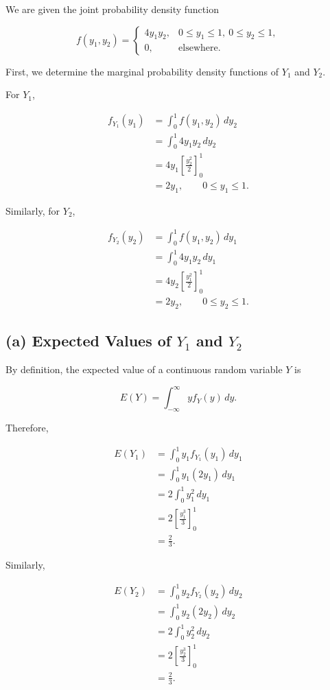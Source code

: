 \documentclass[11pt, a4paper]{article}
\begin{document}
We are given the joint probability density function

\[
f(y_1,y_2)=
\begin{cases}
4y_1y_2, & 0\leq y_1\leq 1,\ 0\leq y_2\leq 1,\\
0, & \text{elsewhere}.
\end{cases}
\]

First, we determine the marginal probability density
functions of $Y_1$ and $Y_2$.

For $Y_1$,

\begin{align*}
f_{Y_1}(y_1)
&= \int_0^1 f(y_1,y_2)\,dy_2\\
&= \int_0^1 4y_1y_2\,dy_2\\
&= 4y_1\left[\frac{y_2^2}{2}\right]_0^1\\
&= 2y_1,\qquad 0\leq y_1\leq 1.
\end{align*}

Similarly, for $Y_2$,

\begin{align*}
f_{Y_2}(y_2)
&= \int_0^1 f(y_1,y_2)\,dy_1\\
&= \int_0^1 4y_1y_2\,dy_1\\
&= 4y_2\left[\frac{y_1^2}{2}\right]_0^1\\
&= 2y_2,\qquad 0\leq y_2\leq 1.
\end{align*}

\subsection{(a) Expected Values of $Y_1$ and $Y_2$}

By definition, the expected value of a continuous
random variable $Y$ is

\[
E(Y)=\int_{-\infty}^{\infty} y f_Y(y)\,dy.
\]

Therefore,

\begin{align*}
E(Y_1)
&= \int_0^1 y_1 f_{Y_1}(y_1)\,dy_1\\
&= \int_0^1 y_1(2y_1)\,dy_1\\
&= 2\int_0^1 y_1^2\,dy_1\\
&= 2\left[\frac{y_1^3}{3}\right]_0^1\\
&= \frac{2}{3}.
\end{align*}

Similarly,

\begin{align*}
E(Y_2)
&= \int_0^1 y_2 f_{Y_2}(y_2)\,dy_2\\
&= \int_0^1 y_2(2y_2)\,dy_2\\
&= 2\int_0^1 y_2^2\,dy_2\\
&= 2\left[\frac{y_2^3}{3}\right]_0^1\\
&= \frac{2}{3}.
\end{align*}
\end{document}

